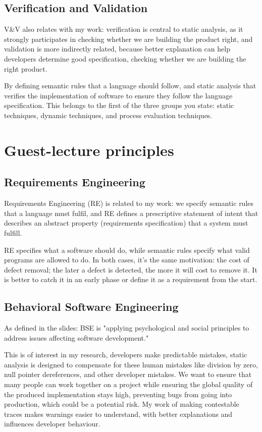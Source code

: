 \documentclass[11pt]{article}
\begin{document}
\subsection{Verification and Validation}
\label{sec:org5a9bb06}
V\&V also relates with my work: verification is central to static analysis, as it
strongly participates in checking whether we are building the product right, and
validation is more indirectly related, because better explanation can help
developers determine good specification, checking whether we are building the
right product.

By defining semantic rules that a language should follow, and static analysis
that verifies the implementation of software to ensure they follow the language
specification. This belongs to the first of the three groups you state: static
techniques, dynamic techniques, and process evaluation techniques.
\section{Guest-lecture principles}
\label{sec:org5d31464}
\subsection{Requirements Engineering}
\label{sec:orgc5576f5}
Requirements Engineering (RE) is related to my work: we specify semantic rules
that a language must fulfil, and RE defines a prescriptive statement of intent
that describes an abstract property (requirements specification) that a system
must fulfill.

RE specifies what a software should do, while semantic rules specify what valid
programs are allowed to do. In both cases, it's the same motivation: the cost of
defect removal; the later a defect is detected, the more it will cost to remove
it. It is better to catch it in an early phase or define it as a requirement
from the start.
\subsection{Behavioral Software Engineering}
\label{sec:org71b7d0f}
As defined in the slides: BSE is "applying psychological and social principles
to address issues affecting software development."

This is of interest in my research, developers make predictable mistakes, static
analysis is designed to compensate for these human mistakes like division by
zero, null pointer dereferences, and other developer mistakes. We want to ensure
that many people can work together on a project while ensuring the global
quality of the produced implementation stays high, preventing bugs from going
into production, which could be a potential risk. My work of making contestable
traces makes warnings easier to understand, with better explanations and
influences developer behaviour.
\end{document}
